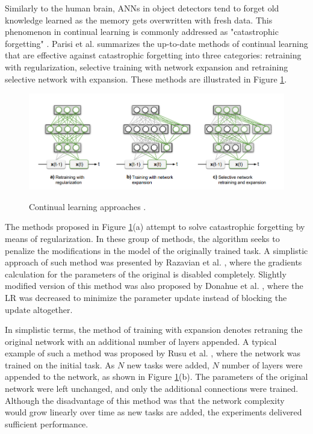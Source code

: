 \documentclass[english, 12pt, a4paper, elec, utf8, a-1b, online]{aaltothesis}
\begin{document}
Similarly to the human brain, ANNs in object detectors tend to forget old knowledge learned as the memory gets overwritten with fresh data. This phenomenon in continual learning is commonly addressed as "catastrophic forgetting" \cite{Parisi2018}. Parisi et al. summarizes the up-to-date methods of continual learning that are effective against catastrophic forgetting into three categories: retraining with regularization, selective training with network expansion and retraining selective network with expansion. These methods are illustrated in Figure \ref{continual}. 

\begin{figure}[htb]
	\begin{center}
		\includegraphics[width=16cm]{./continual.png}
	\end{center}
	\caption{Continual learning approaches
\cite{Parisi2018}.}
	\begin{center}
		\label{continual}
	\end{center}
\end{figure}
\FloatBarrier

The methods proposed in Figure \ref{continual}(a) attempt to solve catastrophic forgetting by means of regularization. In these group of methods, the algorithm seeks to penalize the modifications in the model of the originally trained task. A simplistic approach of such method was presented by Razavian et al.  \cite{Razavian2014}, where the gradients calculation for the parameters of the original is disabled completely. Slightly modified version of this method was also proposed by Donahue et al. \cite{Donahue2013}, where the LR was decreased to minimize the parameter update instead of blocking the update altogether. 


In simplistic terms, the method of training with expansion denotes retraning the original network with an additional number of layers appended. A typical example of such a method was proposed by Rusu et al. \cite{Rusu2016}, where the network was trained on the initial task. As $N$ new tasks were added, $N$ number of layers were appended to the network, as shown in Figure \ref{continual}(b). The parameters of the original network were left unchanged, and only the additional connections were trained. Although the disadvantage of this method was that the network complexity would grow linearly over time as new tasks are added, the experiments delivered sufficient performance. 
\end{document}
